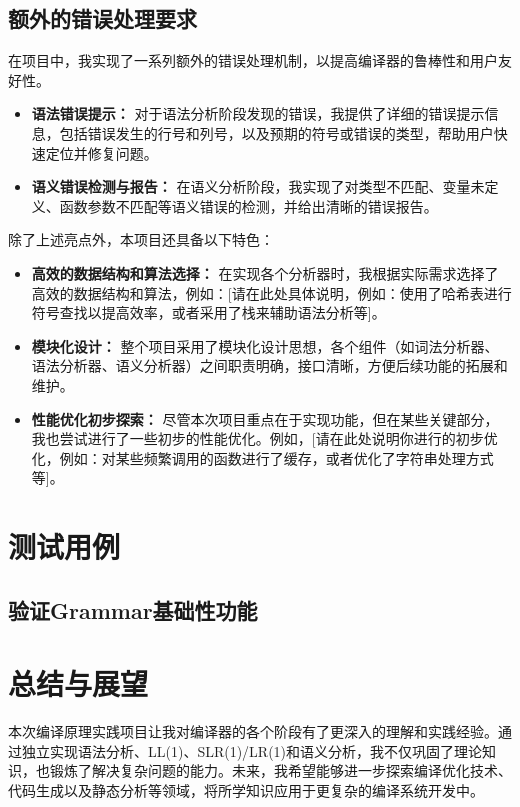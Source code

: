 \documentclass[UTF8,openany]{ctexbook}
\begin{document}
\section{额外的错误处理要求} %

在项目中，我实现了一系列额外的错误处理机制，以提高编译器的鲁棒性和用户友好性。

\begin{itemize}
    \item \textbf{语法错误提示：} 对于语法分析阶段发现的错误，我提供了详细的错误提示信息，包括错误发生的行号和列号，以及预期的符号或错误的类型，帮助用户快速定位并修复问题。 
    \item \textbf{语义错误检测与报告：} 在语义分析阶段，我实现了对类型不匹配、变量未定义、函数参数不匹配等语义错误的检测，并给出清晰的错误报告。 
\end{itemize}

除了上述亮点外，本项目还具备以下特色： 

\begin{itemize}
    \item \textbf{高效的数据结构和算法选择：} 在实现各个分析器时，我根据实际需求选择了高效的数据结构和算法，例如：[请在此处具体说明，例如：使用了哈希表进行符号查找以提高效率，或者采用了栈来辅助语法分析等]。 
    \item \textbf{模块化设计：} 整个项目采用了模块化设计思想，各个组件（如词法分析器、语法分析器、语义分析器）之间职责明确，接口清晰，方便后续功能的拓展和维护。 
    \item \textbf{性能优化初步探索：} 尽管本次项目重点在于实现功能，但在某些关键部分，我也尝试进行了一些初步的性能优化。例如，[请在此处说明你进行的初步优化，例如：对某些频繁调用的函数进行了缓存，或者优化了字符串处理方式等]。 
\end{itemize}

\chapter{测试用例}
\label{sec:test}

\section{验证Grammar基础性功能}
\label{sec:test_grammar}


\chapter{总结与展望}
\label{sec:conclusion}

本次编译原理实践项目让我对编译器的各个阶段有了更深入的理解和实践经验。通过独立实现语法分析、LL(1)、SLR(1)/LR(1)和语义分析，我不仅巩固了理论知识，也锻炼了解决复杂问题的能力。未来，我希望能够进一步探索编译优化技术、代码生成以及静态分析等领域，将所学知识应用于更复杂的编译系统开发中。




\end{document}
